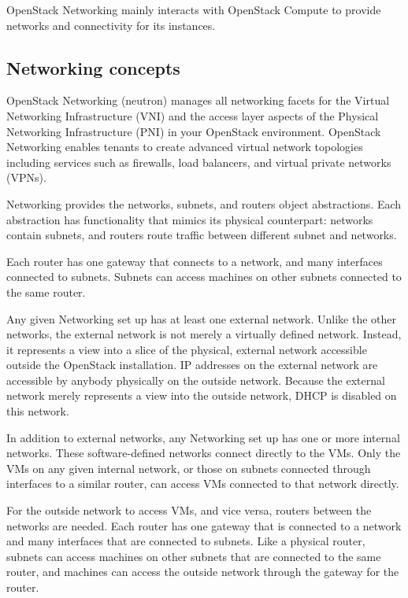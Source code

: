     \par OpenStack Networking mainly interacts with OpenStack Compute to provide networks and connectivity for its instances.
    
    
    \subsection{Networking concepts}

    \par OpenStack Networking (neutron) manages all networking facets for the Virtual Networking Infrastructure (VNI) and the access layer aspects of the Physical Networking Infrastructure (PNI) in your OpenStack environment. OpenStack Networking enables tenants to create advanced virtual network topologies including services such as firewalls, load balancers, and virtual private networks (VPNs).

    \par Networking provides the networks, subnets, and routers object abstractions. Each abstraction has functionality that mimics its physical counterpart: networks contain subnets, and routers route traffic between different subnet and networks.
    
    \par Each router has one gateway that connects to a network, and many interfaces connected to subnets. Subnets can access machines on other subnets connected to the same router.
    
    \par Any given Networking set up has at least one external network. Unlike the other networks, the external network is not merely a virtually defined network. Instead, it represents a view into a slice of the physical, external network accessible outside the OpenStack installation. IP addresses on the external network are accessible by anybody physically on the outside network. Because the external network merely represents a view into the outside network, DHCP is disabled on this network.
    
    \par In addition to external networks, any Networking set up has one or more internal networks. These software-defined networks connect directly to the VMs. Only the VMs on any given internal network, or those on subnets connected through interfaces to a similar router, can access VMs connected to that network directly.
    
    \par For the outside network to access VMs, and vice versa, routers between the networks are needed. Each router has one gateway that is connected to a network and many interfaces that are connected to subnets. Like a physical router, subnets can access machines on other subnets that are connected to the same router, and machines can access the outside network through the gateway for the router.
    
